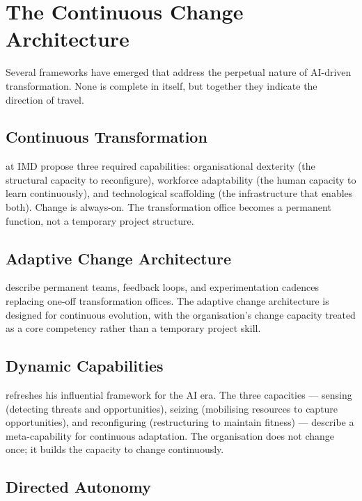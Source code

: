 \section{The Continuous Change Architecture}

Several frameworks have emerged that address the perpetual nature of AI-driven transformation. None is complete in itself, but together they indicate the direction of travel.

\subsection{Continuous Transformation}

\textcite{WadeBonnet2025} at IMD propose three required capabilities: organisational dexterity (the structural capacity to reconfigure), workforce adaptability (the human capacity to learn continuously), and technological scaffolding (the infrastructure that enables both). Change is always-on. The transformation office becomes a permanent function, not a temporary project structure.

\subsection{Adaptive Change Architecture}

\textcite{Deloitte2026} describe permanent teams, feedback loops, and experimentation cadences replacing one-off transformation offices. The adaptive change architecture is designed for continuous evolution, with the organisation's change capacity treated as a core competency rather than a temporary project skill.

\subsection{Dynamic Capabilities}

\textcite{Teece2025} refreshes his influential framework for the AI era. The three capacities --- sensing (detecting threats and opportunities), seizing (mobilising resources to capture opportunities), and reconfiguring (restructuring to maintain fitness) --- describe a meta-capability for continuous adaptation. The organisation does not change once; it builds the capacity to change continuously.

\subsection{Directed Autonomy}

